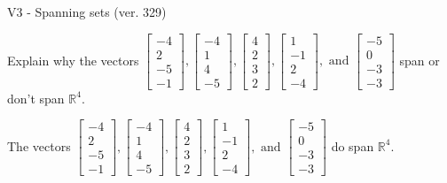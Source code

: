 \begin{exercise}
  \begin{exerciseTitle}V3 - Spanning sets (ver. 329)\end{exerciseTitle}
  \begin{exerciseStatement}
    Explain why the vectors \(\left[\begin{array}{r}
-4 \\
2 \\
-5 \\
-1
\end{array}\right] , \left[\begin{array}{r}
-4 \\
1 \\
4 \\
-5
\end{array}\right] , \left[\begin{array}{r}
4 \\
2 \\
3 \\
2
\end{array}\right] , \left[\begin{array}{r}
1 \\
-1 \\
2 \\
-4
\end{array}\right] , \text{ and } \left[\begin{array}{r}
-5 \\
0 \\
-3 \\
-3
\end{array}\right]\) span or don't span \(\mathbb{R}^4\). 
	


  \end{exerciseStatement}
  \begin{exerciseAnswer}
   The vectors \(\left[\begin{array}{r}
-4 \\
2 \\
-5 \\
-1
\end{array}\right] , \left[\begin{array}{r}
-4 \\
1 \\
4 \\
-5
\end{array}\right] , \left[\begin{array}{r}
4 \\
2 \\
3 \\
2
\end{array}\right] , \left[\begin{array}{r}
1 \\
-1 \\
2 \\
-4
\end{array}\right] , \text{ and } \left[\begin{array}{r}
-5 \\
0 \\
-3 \\
-3
\end{array}\right]\) 
  	 do  
	span \(\mathbb{R}^4\).
  



\end{exerciseAnswer}
\end{exercise}
